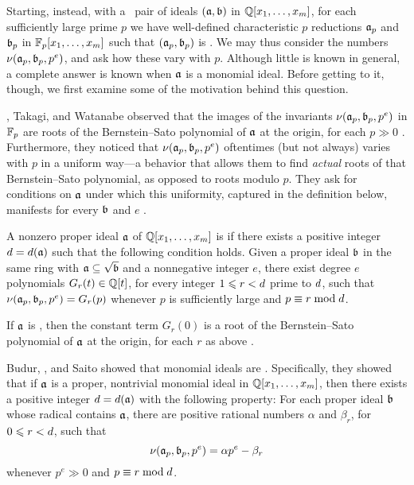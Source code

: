\documentclass{amsart}
\begin{document}
Starting, instead, with a \compatible\ pair of ideals $(\mathfrak{a},\mathfrak{b})$ in $\mathbb{Q}[x_1,\ldots,x_m]$, for each sufficiently large prime $p$ we have well-defined characteristic $p$ reductions $\mathfrak{a}_p$ and $\mathfrak{b}_p$ in $\mathbb{F}_p[x_1,\ldots,x_m]$ such that $(\mathfrak{a}_p,\mathfrak{b}_p)$ is \compatible.
We may thus consider the numbers $\nu(\mathfrak{a}_p,\mathfrak{b}_p,p^e)$, and ask how these vary with $p$.
Although little is known in general, a complete answer is known when $\mathfrak{a}$ is a monomial ideal.
Before getting to it, though, we first examine some of the motivation behind this question.

\mustata, Takagi, and Watanabe observed that the images of the invariants $\nu(\mathfrak{a}_p,\mathfrak{b}_p,p^e)$ in $\mathbb{F}_p$ are roots of the Bernstein--Sato polynomial of $\mathfrak{a}$ at the origin, for each $p \gg 0$ \cite[Proposition~3.11]{mustata+takagi+watanabe.F-thresholds}.
Furthermore, they noticed that $\nu(\mathfrak{a}_p,\mathfrak{b}_p,p^e)$ oftentimes (but not always) varies with $p$ in a uniform way---a behavior that allows them to find \emph{actual} roots of that Bernstein--Sato polynomial, as opposed to roots modulo $p$.
They ask for conditions on $\mathfrak{a}$ under which this uniformity, captured in the definition below, manifests for every $\mathfrak{b}$ and $e$ \cite[Problem~3.8]{mustata+takagi+watanabe.F-thresholds}.

\begin{definition}
   \label{defn: nuCool}
   A nonzero proper ideal $\mathfrak{a}$ of $\mathbb{Q}[x_1,\ldots,x_m]$ is \emph{\nuCool} if there exists a positive integer $d = d(\mathfrak{a})$ such that the following condition holds.
   Given a proper ideal $\mathfrak{b}$ in the same ring with $\mathfrak{a} \subseteq \sqrt {\mathfrak{b}}$ and a nonnegative integer $e$, there exist degree $e$ polynomials $G_r(t) \in \mathbb{Q}[t]$, for every integer $1 \leqslant r < d$ prime to $d$, such that $\nu(\mathfrak{a}_p, \mathfrak{b}_p, p^e) = G_r(p)$ whenever $p$ is sufficiently large and $p \equiv r \bmod d$.
\end{definition}

If $\mathfrak{a}$ is \nuCool, then the constant term $G_r(0)$ is a root of the Bernstein--Sato polynomial of $\mathfrak{a}$ at the origin, for each $r$ as above \cite[Remark~3.13]{mustata+takagi+watanabe.F-thresholds}.

\smallskip

Budur, \mustata, and Saito showed that monomial ideals are \nuCool \cite[Theorem~4.1]{budur+mustata+saito.roots_bs_polys_monomial}.
Specifically, they showed that if $\mathfrak{a}$ is a proper, nontrivial monomial ideal in $\mathbb{Q}[x_1,\ldots,x_m]$, then there exists a positive integer $d = d(\mathfrak{a})$ with the following property:
For each proper ideal $\mathfrak{b}$ whose radical contains $\mathfrak{a}$, there are positive rational numbers $\alpha$ and $\beta_r$, for $0 \leqslant r < d$, such that
\begin{equation}
   \label{eq: nu-uniformity for monomial ideals}
   \nu(\mathfrak{a}_p, \mathfrak{b}_p, p^e) = \alpha p^e - \beta_r
\end{equation}
whenever $p^e \gg 0$ and $p \equiv r \bmod d$.
\end{document}
